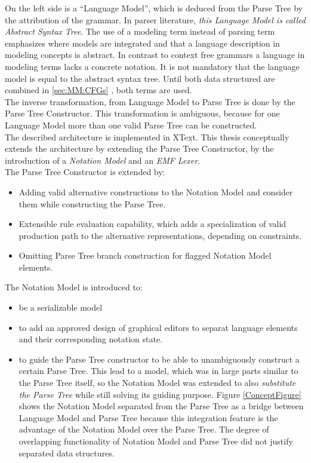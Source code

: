 On the left side is a ``Language Model'', which is deduced from the Parse Tree by the attribution of the grammar. In parser literature, \emph{this Language Model is called Abstract Syntax Tree}. The use of a modeling term instead of parsing term emphasizes where models are integrated and that a language description in modeling concepts is abstract. In contrast to context free grammars a language in modeling terms lacks a concrete notation. It is not mandatory that the language model is equal to the abstract syntax tree. Until both data structured are combined in \ref{sec:MM:CFGs} , both terms are used. \\
The inverse transformation, from Language Model to Parse Tree is done by the Parse Tree Constructor. This transformation is ambiguous, because for one Language Model more than one valid Parse Tree can be constructed. \\
The described architecture is implemented in XText. This thesis conceptually extends the architecture by extending the Parse Tree Constructor, by the introduction of a \emph{Notation Model} and an \emph{EMF Lexer}.\\
The Parse Tree Constructor is extended by:
\begin{itemize}
	\item Adding valid alternative constructions to the Notation Model and consider them while constructing the Parse Tree. 
	\item Extensible rule evaluation capability, which adds a specialization of valid production path to the alternative representations, depending on constraints. 
	\item Omitting Parse Tree branch construction for flagged Notation Model elements.
\end{itemize}
The Notation Model is introduced to:
\begin{itemize}
	\item be a serializable model
	\item to add an approved design of graphical editors to separat language elements and their corresponding notation state.
	\item to guide the Parse Tree constructor to be able to unambiguously construct a certain Parse Tree. This lead to a model, which was in large parts similar to the Parse Tree itself, so the Notation Model was extended to also \emph{substitute the Parse Tree} while still solving its guiding purpose. Figure \ref{ConceptFigure} shows the Notation Model separated from the Parse Tree as a bridge between Language Model and Parse Tree because this integration feature is the advantage of the Notation Model over the Parse Tree. The degree of overlapping functionality of Notation Model and Parse Tree did not justify separated data structures.
\end{itemize} 
